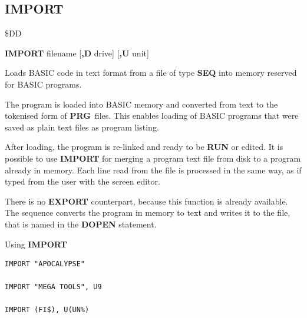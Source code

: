 \newpage
\subsection{IMPORT}
\begin{description}[leftmargin=2cm,style=nextline]
\item [Token:]    \$DD

\item [Format:]   {\bf IMPORT} filename [{\bf,D} drive] [{\bf,U} unit]

\item [Usage:]    Loads BASIC code in text format from a file of type {\bf SEQ} into memory reserved for BASIC programs.

                  \filenamedefinition

                  \drivedefinition

                  \unitdefinition

\item [Remarks:]  The program is loaded into BASIC memory and converted from text to the tokenised form of {\bf PRG} files. This enables loading of BASIC programs that were saved as plain text files as program listing.

                  After loading, the program is re-linked and ready to be {\bf RUN} or edited. It is possible to use {\bf IMPORT} for merging a program text file from disk to a program already in memory. Each line read from the file is processed in the same way, as if typed from the user with the screen editor.

                  There is no {\bf EXPORT} counterpart, because this function is already available. The sequence  converts the program in memory to text and writes it to the file, that is named in the {\bf DOPEN} statement.

\item [Examples:] Using {\bf IMPORT}

\begin{tcolorbox}[colback=black,coltext=white]
\verbatimfont{\codefont}
\begin{verbatim}
IMPORT "APOCALYPSE"

IMPORT "MEGA TOOLS", U9

IMPORT (FI$), U(UN%)
\end{verbatim}
\end{tcolorbox}
\end{description}

